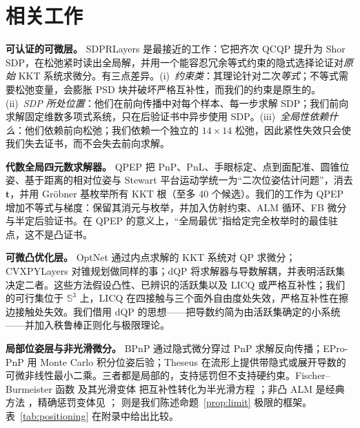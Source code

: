 \section{相关工作}\label{sec:related}

\textbf{可认证的可微层。} SDPRLayers \cite{holmes2025sdpr} 是最接近的工作：它把齐次 QCQP 提升为 Shor SDP，在松弛紧时读出全局解，并用一个能容忍冗余等式约束的隐式选择论证对\emph{原始} KKT 系统求微分。有三点差异。(i)~\emph{约束类}：其理论针对二次\emph{等式}；不等式需要松弛变量，会膨胀 PSD 块并破坏严格互补性，而我们的约束是原生的。(ii)~\emph{SDP 所处位置}：他们在前向传播中对每个样本、每一步求解 SDP；我们前向求解固定维数多项式系统，只在后验证书中异步使用 SDP。(iii)~\emph{全局性依赖什么}：他们依赖前向松弛；我们依赖一个独立的 $14\times14$ 松弛，因此紧性失效只会使我们失去证书，而不会失去前向求解。

\textbf{代数全局四元数求解器。} QPEP \cite{wu2022qpep} 把 PnP、PnL、手眼标定、点到面配准、圆锥位姿、基于距离的相对位姿与 Stewart 平台运动学统一为“二次位姿估计问题”，消去 $\mathbf t$，并用 Gr\"obner 基枚举所有 KKT 根（至多 40 个候选）。我们的工作为 QPEP 增加不等式与梯度：保留其消元与枚举，并加入仿射约束、ALM 循环、FB 微分与半定后验证书。在 QPEP 的意义上，“全局最优”指给定完全枚举时的最佳驻点，这不是凸证书。

\textbf{可微凸优化层。} OptNet \cite{amos2017optnet} 通过内点求解的 KKT 系统对 QP 求微分；CVXPYLayers \cite{agrawal2019cvxpylayers} 对锥规划做同样的事；dQP \cite{magoon2025dqp} 将求解器与导数解耦，并表明活跃集决定二者。这些方法假设凸性、已辨识的活跃集以及 LICQ 或严格互补性；我们的可行集位于 $\mathbb{S}^3$ 上，LICQ 在四接触与三个面外自由度处失效，严格互补性在擦边接触处失效。我们借用 dQP 的思想——把导数约简为由活跃集确定的小系统——并加入秩鲁棒正则化与极限理论。

\textbf{局部位姿层与非光滑微分。} BPnP \cite{chen2020bpn} 通过隐式微分穿过 PnP 求解反向传播；EPro-PnP \cite{chen2022epropnp} 用 Monte Carlo 积分位姿后验；Theseus \cite{pineda2022theseus} 在流形上提供带隐式或展开导数的可微非线性最小二乘。三者都是局部的，支持惩罚但不支持硬约束。Fischer--Burmeister 函数 \cite{fischer1992} 及其光滑变体 \cite{kanzow1996} 把互补性转化为半光滑方程 \cite{facchinei2003}；非凸 ALM 是经典方法 \cite{bertsekas1982,rockafellar1998}，精确惩罚变体见 \cite{fletcher1987}；\cite{bolte2021nonsmooth} 则是我们陈述命题~\ref{prop:limit} 极限的框架。表~\ref{tab:positioning} 在附录中给出比较。

